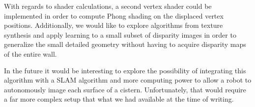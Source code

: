 \documentclass[a4paper,twoside]{article}
\begin{document}
With regards to shader calculations, a second vertex shader could be implemented in order to compute Phong shading on the displaced vertex positions. Additionally, we would like to explore algorithms from texture synthesis and apply learning to a small subset of disparity images in order to generalize the small detailed geometry without having to acquire disparity maps of the entire wall.

In the future it would be interesting to explore the possibility of integrating this algorithm with a SLAM algorithm and more computing power to allow a robot to autonomously image each surface of a cistern. 
Unfortunately, that would require a far more complex setup that what we had available at the time of writing.





\end{document}
